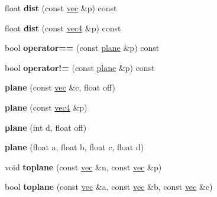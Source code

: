 \begin{DoxyCompactItemize}
\item 
\mbox{\label{structplane_a4bc5b416116e61307c593a1ee5d73281}} 
float {\bfseries dist} (const \hyperlink{structvec}{vec} \&p) const
\item 
\mbox{\label{structplane_a38be6e4f456711a7dece43fdf12ed703}} 
float {\bfseries dist} (const \hyperlink{structvec4}{vec4} \&p) const
\item 
\mbox{\label{structplane_a0882121066bc5f4f34f965b3e18d60ce}} 
bool {\bfseries operator==} (const \hyperlink{structplane}{plane} \&p) const
\item 
\mbox{\label{structplane_a682741d8ee503378936ae20907d0a323}} 
bool {\bfseries operator!=} (const \hyperlink{structplane}{plane} \&p) const
\item 
\mbox{\label{structplane_acf3a0b8d771bc929ed36d2b87a10eeb1}} 
{\bfseries plane} (const \hyperlink{structvec}{vec} \&c, float off)
\item 
\mbox{\label{structplane_adadc9df9c0775fa85ce8d1028b046d18}} 
{\bfseries plane} (const \hyperlink{structvec4}{vec4} \&p)
\item 
\mbox{\label{structplane_af833df5f838bfa4f6a6379d9d5434766}} 
{\bfseries plane} (int d, float off)
\item 
\mbox{\label{structplane_adbf234bb1d3aca2d226e32cb6dea9199}} 
{\bfseries plane} (float a, float b, float c, float d)
\item 
\mbox{\label{structplane_a57ec4c0e7e18d9bc83977d5fa27862aa}} 
void {\bfseries toplane} (const \hyperlink{structvec}{vec} \&n, const \hyperlink{structvec}{vec} \&p)
\item 
\mbox{\label{structplane_a76cdb75954a0c957833ef6135b2356af}} 
bool {\bfseries toplane} (const \hyperlink{structvec}{vec} \&a, const \hyperlink{structvec}{vec} \&b, const \hyperlink{structvec}{vec} \&c)
\item 
\mbox{\label{structplane_a4b7f932968c3e872973be3ebcd53f00f}} 

\end{DoxyCompactItemize}
